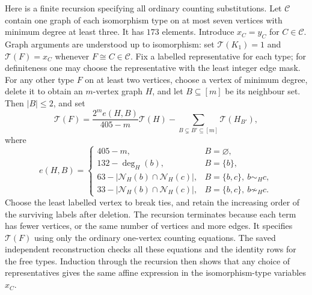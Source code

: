 \documentclass[11pt]{article}
\theoremstyle{remark}
\numberwithin{equation}{section}
\begin{document}
Here is a finite recursion specifying all ordinary counting substitutions.
Let $\mathcal C$ contain one graph of each isomorphism type on at most
seven vertices with minimum degree at least three. It has $173$ elements.
Introduce $x_C=y_C$ for $C\in\mathcal C$. Graph arguments are understood
up to isomorphism: set $\mathcal T(K_1)=1$ and
$\mathcal T(F)=x_C$ whenever $F\cong C\in\mathcal C$.
Fix a labelled representative for each type; for definiteness one may
choose the representative with the least integer edge mask.
For any other type $F$ on at least two vertices, choose a vertex of
minimum degree, delete it to obtain an $m$-vertex graph $H$, and let
$B\subseteq[m]$ be its neighbour set. Then $|B|\le2$, and set
\begin{equation}
 \mathcal T(F)=\frac{2^m e(H,B)}{405-m}\mathcal T(H)
 -\sum_{B\subsetneq B'\subseteq[m]}\mathcal T(H_{B'}),
 \label{eq:405-printed-recursion}
\end{equation}
where
\[
 e(H,B)=
 \begin{cases}
 405-m,&B=\varnothing,\\
 132-\deg_H(b),&B=\{b\},\\
 63-|\mathcal N_H(b)\cap\mathcal N_H(c)|,
       &B=\{b,c\},\ b\sim_Hc,\\
 33-|\mathcal N_H(b)\cap\mathcal N_H(c)|,
       &B=\{b,c\},\ b\not\sim_Hc.
 \end{cases}
\]
Choose the least labelled vertex to break ties, and retain the increasing
order of the surviving labels after deletion. The recursion terminates
because each term has fewer
vertices, or the same number of vertices and more edges. It specifies
$\mathcal T(F)$ using only the ordinary one-vertex counting equations.
The saved independent reconstruction checks all these equations and the
identity rows for the free types. Induction through the recursion then
shows that any choice of representatives gives the same affine expression
in the isomorphism-type variables $x_C$.
\end{document}
